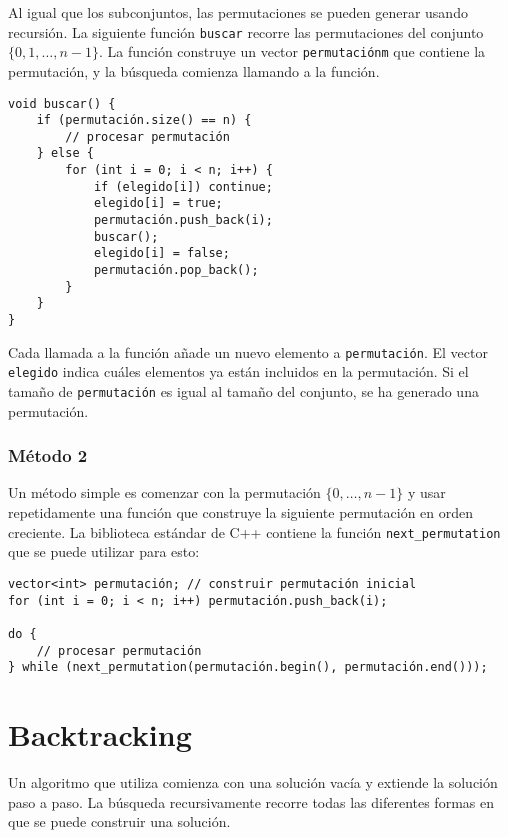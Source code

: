 Al igual que los subconjuntos, las permutaciones se pueden generar
usando recursión.
La siguiente función \texttt{buscar} recorre
las permutaciones del conjunto $\{0,1,\ldots,n-1\}$.
La función construye un vector \texttt{permutaciónm}
que contiene la permutación,
y la búsqueda comienza llamando a la función.

\begin{lstlisting}
void buscar() {
    if (permutación.size() == n) {
        // procesar permutación
    } else {
        for (int i = 0; i < n; i++) {
            if (elegido[i]) continue;
            elegido[i] = true;
            permutación.push_back(i);
            buscar();
            elegido[i] = false;
            permutación.pop_back();
        }
    }
}
\end{lstlisting}

Cada llamada a la función añade un nuevo elemento a
\texttt{permutación}.
El vector \texttt{elegido} indica cuáles
elementos ya están incluidos en la permutación.
Si el tamaño de \texttt{permutación} es igual al tamaño del conjunto,
se ha generado una permutación.

\subsubsection{Método 2}


Un método simple es comenzar con la permutación
$\{0,\ldots,n-1\}$ y usar repetidamente
una función que construye la siguiente permutación
en orden creciente.
La biblioteca estándar de C++ contiene la función
\texttt{next\_permutation} que se puede utilizar para esto:

\begin{lstlisting}
vector<int> permutación; // construir permutación inicial
for (int i = 0; i < n; i++) permutación.push_back(i);

do {
    // procesar permutación
} while (next_permutation(permutación.begin(), permutación.end()));
\end{lstlisting}

\section{Backtracking}


Un algoritmo que utiliza 
comienza con una solución vacía
y extiende la solución paso a paso.
La búsqueda recursivamente
recorre todas las diferentes formas en que
se puede construir una solución.

